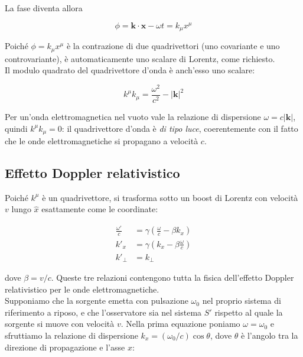 La fase diventa allora

\begin{equation}
    \phi = \mathbf{k} \cdot \mathbf{x} - \omega t = k_{\mu} x^{\mu}
\end{equation}

Poiché $\phi = k_{\mu} x^{\mu}$ è la contrazione di due quadrivettori (uno covariante e uno controvariante), è automaticamente uno scalare di Lorentz, come richiesto.\\

Il modulo quadrato del quadrivettore d'onda è anch'esso uno scalare:

\begin{equation}
    k^{\mu} k_{\mu} = \frac{\omega^2}{c^2} - |\mathbf{k}|^2
\end{equation}

Per un'onda elettromagnetica nel vuoto vale la relazione di dispersione $\omega = c|\mathbf{k}|$, quindi $k^{\mu}k_{\mu} = 0$: il quadrivettore d'onda è \emph{di tipo luce}, coerentemente con il fatto che le onde elettromagnetiche si propagano a velocità $c$.

\newpage

\subsection{Effetto Doppler relativistico}

Poiché $k^{\mu}$ è un quadrivettore, si trasforma sotto un boost di Lorentz con velocità $v$ lungo $\hat{x}$ esattamente come le coordinate:

\begin{tcolorbox}[colback=yellow!10!white, colframe=orange!70!black, boxrule=0.8pt]
\begin{align}
    \frac{\omega'}{c} &= \gamma\left(\frac{\omega}{c} - \beta k_x\right) \\[4pt]
    k'_x &= \gamma\left(k_x - \beta\frac{\omega}{c}\right) \\[4pt]
    k'_{\perp} &= k_{\perp}
\end{align}
\end{tcolorbox}

dove $\beta = v/c$. Queste tre relazioni contengono tutta la fisica dell'effetto Doppler relativistico per le onde elettromagnetiche.\\

Supponiamo che la sorgente emetta con pulsazione $\omega_0$ nel proprio sistema di riferimento a riposo, e che l'osservatore sia nel sistema $S'$ rispetto al quale la sorgente si muove con velocità $v$. Nella prima equazione poniamo $\omega = \omega_0$ e sfruttiamo la relazione di dispersione $k_x = (\omega_0/c)\cos\theta$, dove $\theta$ è l'angolo tra la direzione di propagazione e l'asse $x$:

